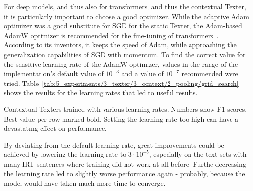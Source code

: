 For deep models, and thus also for transformers, and thus the contextual Texter, it is particularly important to choose a good optimizer. While the adaptive Adam optimizer was a good substitute for SGD for the static Texter, the Adam-based AdamW optimizer is recommended for the fine-tuning of transformers~\cite{Loshchilov2019DecoupledWD}. According to its inventors, it keeps the speed of Adam, while approaching the generalization capabilities of SGD with momentum. To find the correct value for the sensitive learning rate of the AdamW optimizer, values in the range of the implementation's default value of $10^{-3}$ and a value of $10^{-7}$ recommended were tried. Table~\ref{tab:5_experiments/3_texter/3_context/2_pooling/grid_search} shows the results for the learning rates that led to useful results.

\begin{table}[h]
    \centering
    
    \caption{Contextual Texters trained with various learning rates. Numbers show F1 scores. Best value per row marked bold. Setting the learning rate too high can have a devastating effect on performance.}
    \label{tab:5_experiments/3_texter/3_context/3_optimizer/grid_search}
\end{table}

By deviating from the default learning rate, great improvements could be achieved by lowering the learning rate to $3 \cdot 10^{-5}$, especially on the text sets with many IRT sentences where training did not work at all before. Furthe decreasing the learning rate led to slightly worse performance again - probably, because the model would have taken much more time to converge.
